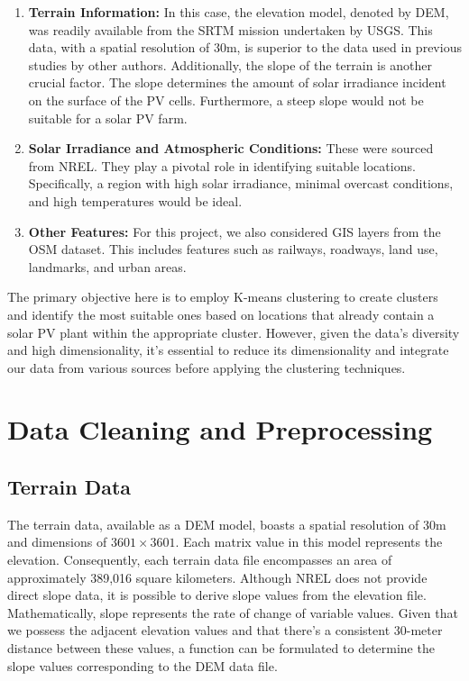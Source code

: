 \documentclass[a4paper,12pt]{Classes/RoboticsLaTeX}
\begin{document}
	\begin{enumerate}
		\item \textbf{Terrain Information:} In this case, the elevation model, denoted by \ac{DEM}, was readily available from the \ac{SRTM} mission undertaken by \ac{USGS}. This data, with a spatial resolution of 30m, is superior to the data used in previous studies by other authors. Additionally, the slope of the terrain is another crucial factor. The slope determines the amount of solar irradiance incident on the surface of the \ac{PV} cells. Furthermore, a steep slope would not be suitable for a solar \ac{PV} farm.
		
		\item \textbf{Solar Irradiance and Atmospheric Conditions:} These were sourced from \ac{NREL}. They play a pivotal role in identifying suitable locations. Specifically, a region with high solar irradiance, minimal overcast conditions, and high temperatures would be ideal.
		
		\item \textbf{Other Features:} For this project, we also considered \ac{GIS} layers from the \ac{OSM} dataset. This includes features such as railways, roadways, land use, landmarks, and urban areas.
	\end{enumerate}
	
	The primary objective here is to employ K-means clustering to create clusters and identify the most suitable ones based on locations that already contain a solar PV plant within the appropriate cluster. 
	However, given the data's diversity and high dimensionality, it's essential to reduce its dimensionality and integrate our data from various sources before applying the clustering techniques.

	\section{Data Cleaning and Preprocessing}

	\subsection{Terrain Data}
		The terrain data, available as a \ac{DEM} model, boasts a spatial resolution of 30m and dimensions of \(3601 \times 3601\). Each matrix value in this model 
		represents the elevation. Consequently, each terrain data file encompasses an area of approximately 389,016 square kilometers. Although \ac{NREL} does not provide 
		direct slope data, it is possible to derive slope values from the elevation file. Mathematically, slope represents the rate of change of variable values. 
		Given that we possess the adjacent elevation values and that there's a consistent 30-meter distance between these values, a function can be formulated to determine the 
		slope values corresponding to the \ac{DEM} data file.
\end{document}
